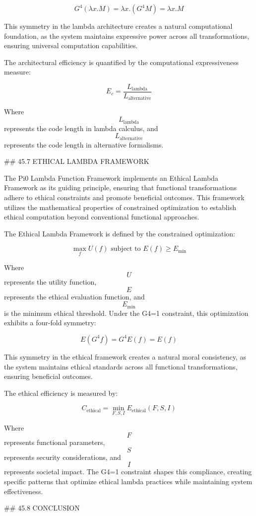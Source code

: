 $$ G^4 (\lambda x.M) = \lambda x.(G^4 M) = \lambda x.M $$

This symmetry in the lambda architecture creates a natural computational foundation, as the system maintains expressive power across all transformations, ensuring universal computation capabilities.

The architectural efficiency is quantified by the computational expressiveness measure:

$$ E_c = \frac{L_{\text{lambda}}}{L_{\text{alternative}}} $$

Where $$ L_{\text{lambda}} $$ represents the code length in lambda calculus, and $$ L_{\text{alternative}} $$ represents the code length in alternative formalisms.

## 45.7 ETHICAL LAMBDA FRAMEWORK

The Pi0 Lambda Function Framework implements an Ethical Lambda Framework as its guiding principle, ensuring that functional transformations adhere to ethical constraints and promote beneficial outcomes. This framework utilizes the mathematical properties of constrained optimization to establish ethical computation beyond conventional functional approaches.

The Ethical Lambda Framework is defined by the constrained optimization:

$$ \max_f U(f) \text{ subject to } E(f) \geq E_{\text{min}} $$

Where $$ U $$ represents the utility function, $$ E $$ represents the ethical evaluation function, and $$ E_{\text{min}} $$ is the minimum ethical threshold. Under the G4=1 constraint, this optimization exhibits a four-fold symmetry:

$$ E(G^4 f) = G^4 E(f) = E(f) $$

This symmetry in the ethical framework creates a natural moral consistency, as the system maintains ethical standards across all functional transformations, ensuring beneficial outcomes.

The ethical efficiency is measured by:

$$ C_{\text{ethical}} = \min_{F, S, I} E_{\text{ethical}}(F, S, I) $$

Where $$ F $$ represents functional parameters, $$ S $$ represents security considerations, and $$ I $$ represents societal impact. The G4=1 constraint shapes this compliance, creating specific patterns that optimize ethical lambda practices while maintaining system effectiveness.

## 45.8 CONCLUSION

